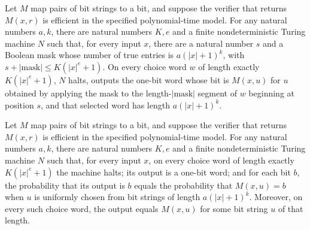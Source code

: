 \begin{theorem}
\label{Randomized.exists_FinNDTM_maskSelect_of_eff}
\leanok
{}
Let $M$ map pairs of bit strings to a bit, and suppose the verifier that returns
$M(x,r)$ is efficient in the specified polynomial-time model. For any natural numbers
$a,k$, there are natural numbers $K,e$ and a finite nondeterministic Turing machine $N$
such that, for every input $x$, there are a natural number $s$ and a Boolean mask whose
number of true entries is $a(|x|+1)^k$, with $s+|\mathrm{mask}|\le K(|x|^e+1)$. On every
choice word $w$ of length exactly $K(|x|^e+1)$, $N$ halts, outputs the one-bit word
whose bit is $M(x,u)$ for $u$ obtained by applying the mask to the
length-$|\mathrm{mask}|$ segment of $w$ beginning at position $s$, and that selected
word has length $a(|x|+1)^k$.
\end{theorem}

\begin{theorem}
\label{Randomized.exists_FinNDTM_of_eff}
\leanok
{}
Let $M$ map pairs of bit strings to a bit, and suppose the verifier that returns
$M(x,r)$ is efficient in the specified polynomial-time model. For any natural numbers
$a,k$, there are natural numbers $K,e$ and a finite nondeterministic Turing machine $N$
such that, for every input $x$, on every choice word of length exactly $K(|x|^e+1)$ the
machine halts; its output is a one-bit word; and for each bit $b$, the probability that
its output is $b$ equals the probability that $M(x,u)=b$ when $u$ is uniformly chosen
from bit strings of length $a(|x|+1)^k$. Moreover, on every such choice word, the output
equals $M(x,u)$ for some bit string $u$ of that length.
\end{theorem}

